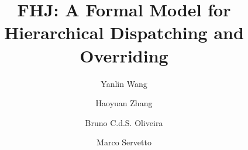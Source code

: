 \documentclass{llncs}
\begin{document}
\title{FHJ: A Formal Model for Hierarchical Dispatching and Overriding}

\author{Yanlin Wang \and Haoyuan Zhang \and Bruno C.d.S. Oliveira \and Marco Servetto}

\maketitle

\vspace{-4ex}
\end{document}
